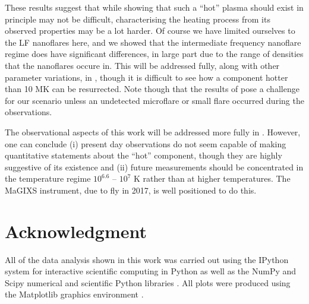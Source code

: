 \documentclass[apj]{emulateapj}
\begin{document}
%
\par These results suggest that while showing that such a ``hot'' plasma should exist in principle may not be difficult, characterising the heating process from its observed properties may be a lot harder. Of course we have limited ourselves to the LF nanoflares here, and we showed \citep{cargill_active_2014} that the intermediate frequency nanoflare regime does have significant differences, in large part due to the range of densities that the nanoflares occure in. This will be addressed fully, along with other parameter variations, in , though it is difficult to see how a component hotter than 10 MK can be resurrected. Note though that the results of \citet{caspi_new_2015} pose a challenge for our scenario unless an undetected microflare or small flare occurred during the observations.
	
	\par The observational aspects of this work will be addressed more fully in . However, one can conclude (i) present day observations do not seem capable of making quantitative statements about the ``hot'' component, though they are highly suggestive of its existence and (ii) future measurements should be concentrated in the temperature regime $10^{6.6}$ – $10^7$ K rather than at higher temperatures. The MaGIXS instrument, due to fly in 2017, is well positioned to do this. 
	
\section*{Acknowledgment}
All of the data analysis shown in this work was carried out using the IPython system for interactive scientific computing in Python as well as the NumPy and Scipy numerical and scientific Python libraries \citep{perez_ipython:_2007,van_der_walt_numpy_2011}. All plots were produced using the Matplotlib graphics environment \citep{hunter_matplotlib:_2007}.
	
\end{document}

